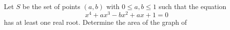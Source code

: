 Let $ S$ be the set of points $ (a,b)$ with $ 0\le a,b\le1$ such that the equation \[x^4 + ax^3 - bx^2 + ax + 1 = 0\]has at least one real root. Determine the area of the graph of 